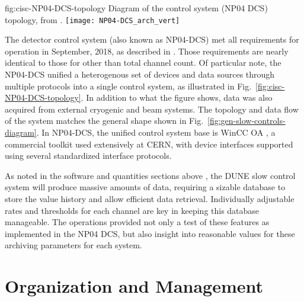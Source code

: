 \begin{dunefigure}{fig:cisc-NP04-DCS-topology}
{Diagram of the  control system (NP04 DCS) topology, from \cite{pdspdcs_proc}.}
\texttt{[image: NP04-DCS\_arch\_vert]}
\end{dunefigure}

The  detector control system (also known as NP04-DCS) met
all requirements for operation in September, 2018, as
described in \cite{pdspdcs_proc}.  Those requirements are
nearly identical to those for  other than
total channel count. Of particular note, the NP04-DCS unified a heterogenous set of devices and data sources
through multiple protocols into a
single control system, as illustrated in
Fig.\ \ref{fig:cisc-NP04-DCS-topology}. In addition to what
the figure shows, data was also acquired from external cryogenic and beam
systems.  The topology and data flow of the system matches the general
shape shown in Fig.\ \ref{fig:gen-slow-controls-diagram}. In NP04-DCS,
the unified control system base is WinCC OA \cite{winccoa}, a
commercial toolkit used extensively at CERN, with device interfaces
supported using several standardized interface protocols.

As noted in the software and quantities sections above  , the DUNE slow control
system will produce massive amounts of data, requiring a sizable database to store the value history and allow efficient data retrieval. Individually adjustable rates and thresholds for each channel are key in keeping this database manageable. The  operations provided not only a test of these features as implemented in the NP04 DCS, but also insight into reasonable values for these archiving parameters for each system.


\section{Organization and Management}
\label{sec:cisc-slow-controls-org}


